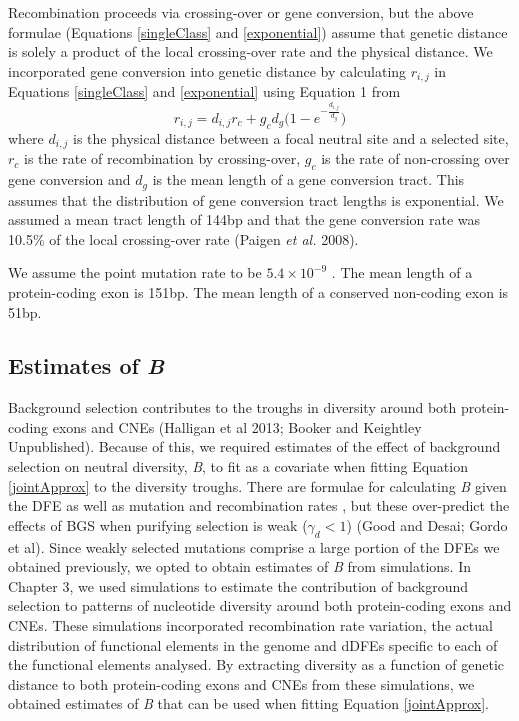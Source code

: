 	Recombination proceeds via crossing-over or gene conversion, but the above formulae (Equations \ref{singleClass} and \ref{exponential}) assume that genetic distance is solely a product of the local crossing-over rate and the physical distance. We incorporated gene conversion into genetic distance by calculating $r_{i,j}$ in Equations \ref{singleClass} and \ref{exponential} using Equation 1 from \cite{RN361}
		\begin{equation}
		\label{geneConversion}
		r_{i,j} = d_{i,j} r_c + g_c d_g \Bigg( 1 - e ^{-\frac{d_{i,j}}{d_g}} \Bigg)
		\end{equation}
	where $d_{i,j}$ is the physical distance between a focal neutral site and a selected site, $r_c$ is the rate of recombination by crossing-over, $g_c$ is the rate of non-crossing over gene conversion and $d_g$ is the mean length of a gene conversion tract. This assumes that the distribution of gene conversion tract lengths is exponential. We assumed a mean tract length of 144bp and that the gene conversion rate was 10.5\% of the local crossing-over rate (Paigen \textit{et al.} 2008).

	We assume the point mutation rate to be $5.4 \times 10^{-9}$ \citep{RN228}.
 	The mean length of a protein-coding exon is 151bp.
 	The mean length of a conserved non-coding exon is 51bp.
	
	
	\subsection{Estimates of \textit{B}} 
 
 	Background selection contributes to the troughs in diversity around both protein-coding exons and CNEs (Halligan et al 2013; Booker and Keightley Unpublished). Because of this, we required estimates of the effect of background selection on neutral diversity, \textit{B}, to fit as a covariate when fitting Equation \ref{jointApprox} to the diversity troughs. There are formulae for calculating \textit{B} given the DFE as well as mutation and recombination rates \citep{RN157, RN206}, but these over-predict the effects of BGS when purifying selection is weak ($\gamma_d < 1$) (Good and Desai; Gordo et al). Since weakly selected mutations comprise a large portion of the DFEs we obtained previously, we opted to obtain estimates of \textit{B} from simulations. In Chapter 3, we used simulations to estimate the contribution of background selection to patterns of nucleotide diversity around both protein-coding exons and CNEs. These simulations incorporated recombination rate variation, the actual distribution of functional elements in the genome and dDFEs specific to each of the functional elements analysed. By extracting diversity as a function of genetic distance to both protein-coding exons and CNEs from these simulations, we obtained estimates of \textit{B} that can be used when fitting Equation \ref{jointApprox}.
 	

